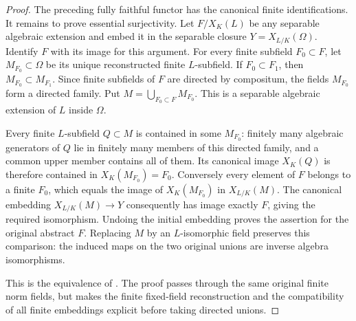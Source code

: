 \begin{proof}
The preceding fully faithful functor has the canonical finite
identifications. It remains to prove essential surjectivity. Let $F/X_K(L)$ be any separable
algebraic extension and embed it in the separable closure
$Y=X_{L/K}(\Omega)$. Identify $F$ with its image for this argument.
For every finite subfield $F_0\subset F$, let $M_{F_0}\subset\Omega$
be its unique reconstructed finite $L$-subfield. If $F_0\subset F_1$,
then $M_{F_0}\subset M_{F_1}$. Since finite subfields of $F$ are
directed by compositum, the fields $M_{F_0}$ form a directed family.
Put $M=\bigcup_{F_0\subset F}M_{F_0}$. This is a separable algebraic
extension of $L$ inside $\Omega$.

Every finite $L$-subfield $Q\subset M$ is contained in some
$M_{F_0}$: finitely many algebraic generators of $Q$ lie in finitely
many members of this directed family, and a common upper member
contains all of them. Its canonical image $X_K(Q)$ is therefore
contained in $X_K(M_{F_0})=F_0$. Conversely every element of $F$
belongs to a finite $F_0$, which equals the image of
$X_K(M_{F_0})$ in $X_{L/K}(M)$. The canonical embedding
$X_{L/K}(M)\to Y$ consequently has image exactly $F$, giving the
required isomorphism. Undoing the initial embedding proves the
assertion for the original abstract $F$.
Replacing $M$ by an $L$-isomorphic field preserves this comparison:
the induced maps on the two original unions are inverse algebra
isomorphisms.

This is the equivalence of \cite{Wintenberger1983}. The proof passes
through the same original finite norm fields, but makes the finite
fixed-field reconstruction and the compatibility of all finite
embeddings explicit before taking directed unions.
\end{proof}

